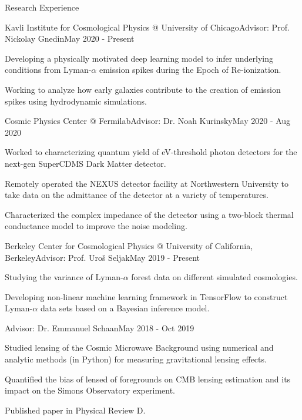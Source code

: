 \documentclass{resume} %
\begin{document}
\begin{rSection}{Research Experience}

\begin{rSubsection}{Kavli Institute for Cosmological Physics @ University of Chicago}{}{Advisor: Prof. Nickolay Gnedin}{May 2020 - Present} \\
\item Developing a physically motivated deep learning model to infer underlying conditions from Lyman-$\alpha$ emission spikes during the Epoch of Re-ionization.
\item Working to analyze how early galaxies contribute to the creation of emission spikes using hydrodynamic simulations.
\end{rSubsection}

\begin{rSubsection}{Cosmic Physics Center @ Fermilab}{}{Advisor: Dr. Noah Kurinsky}{May 2020 - Aug 2020}

\item Worked to characterizing quantum yield of eV-threshold photon detectors for the next-gen SuperCDMS Dark Matter detector.
\item Remotely operated the NEXUS detector facility at Northwestern University to take data on the admittance of the detector at a variety of temperatures.
\item Characterized the complex impedance of the detector using a two-block thermal conductance model to improve the noise modeling.
\end{rSubsection}

\begin{rSubsection}{Berkeley Center for Cosmological Physics @ University of California, Berkeley}{}{Advisor: Prof. Uro\v{s} Seljak}{May 2019 - Present}
\item Studying the variance of Lyman-$\alpha$ forest data on different simulated cosmologies.
\item Developing non-linear machine learning framework in TensorFlow to construct Lyman-$\alpha$ data sets based on a Bayesian inference model.
\end{rSubsection}
\vspace{-.8cm}
\begin{rSubsection}{}{}{Advisor: Dr. Emmanuel Schaan}{May 2018 - Oct 2019}
\item Studied lensing of the Cosmic Microwave Background using numerical and analytic methods (in Python) for measuring gravitational lensing effects.
\item Quantified the bias of lensed of foregrounds on CMB lensing estimation and its impact on the Simons Observatory experiment.
\item Published paper in Physical Review D.
\end{rSubsection}


\end{rSection}
\end{document}
